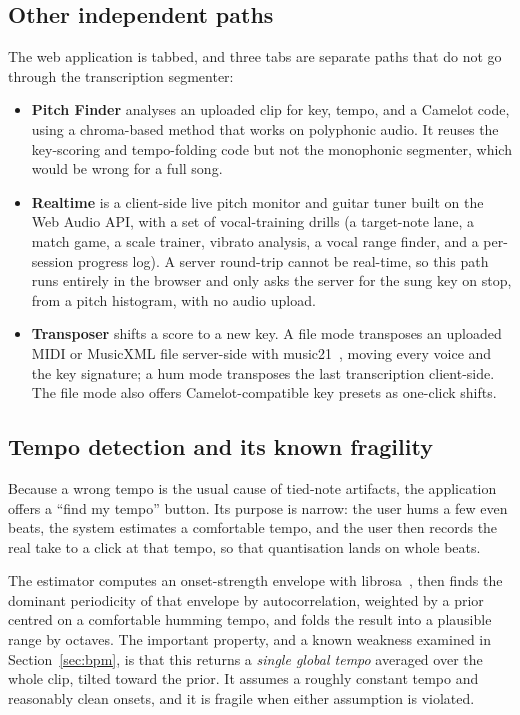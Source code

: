 \documentclass[12pt,a4paper]{article}
\begin{document}
\subsection{Other independent paths}

The web application is tabbed, and three tabs are separate paths that do not go
through the transcription segmenter:

\begin{itemize}
    \item \textbf{Pitch Finder} analyses an uploaded clip for key, tempo, and a
    Camelot code, using a chroma-based method that works on polyphonic audio.
    It reuses the key-scoring and tempo-folding code but not the monophonic
    segmenter, which would be wrong for a full song.
    \item \textbf{Realtime} is a client-side live pitch monitor and guitar
    tuner built on the Web Audio API, with a set of vocal-training drills (a
    target-note lane, a match game, a scale trainer, vibrato analysis, a vocal
    range finder, and a per-session progress log). A server round-trip cannot
    be real-time, so this path runs entirely in the browser and only asks the
    server for the sung key on stop, from a pitch histogram, with no audio
    upload.
    \item \textbf{Transposer} shifts a score to a new key. A file mode
    transposes an uploaded MIDI or MusicXML file server-side with
    music21~\cite{music21}, moving every voice and the key signature; a hum
    mode transposes the last transcription client-side. The file mode also
    offers Camelot-compatible key presets as one-click shifts.
\end{itemize}

\subsection{Tempo detection and its known fragility}
\label{sec:tempo-design}

Because a wrong tempo is the usual cause of tied-note artifacts, the
application offers a ``find my tempo'' button. Its purpose is narrow: the user
hums a few even beats, the system estimates a comfortable tempo, and the user
then records the real take to a click at that tempo, so that quantisation lands
on whole beats.

The estimator computes an onset-strength envelope with
librosa~\cite{librosa}, then finds the dominant periodicity of that envelope by
autocorrelation, weighted by a prior centred on a comfortable humming tempo,
and folds the result into a plausible range by octaves. The important property,
and a known weakness examined in Section~\ref{sec:bpm}, is that this returns a
\emph{single global tempo} averaged over the whole clip, tilted toward the
prior. It assumes a roughly constant tempo and reasonably clean onsets, and it
is fragile when either assumption is violated.
\end{document}
